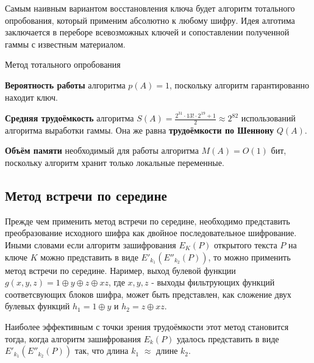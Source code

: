 \documentclass[a4paper,12pt]{article}
\theoremstyle{definition}
\begin{document}
	Самым наивным вариантом восстановления ключа будет алгоритм тотального опробования, который применим абсолютно к любому шифру. Идея алготима заключается в переборе всевозможных ключей и сопоставлении полученной гаммы с известным материалом.

	\begin{algorithm}[H]
		
		\caption{Метод тотального опробования}
		\label{alg:Total}
		\SetAlgoNoEnd
		
		
	\end{algorithm}	
	
	
	\textbf{Вероятность работы} алгоритма $p(A)=1$, поскольку алгоритм гарантированно находит ключ. 
	
	\textbf{Средняя трудоёмкость} алгоритма $S(A)=\frac{2^{31} \cdot 13! \cdot 2^{19} + 1}{2} \approx 2^{82} $ использований алгоритма выработки гаммы. Она же равна \textbf{трудоёмкости по Шеннону} $Q(A)$.
	
	\textbf{Объём памяти} необходимый для работы алгоритма $M(A) = O(1)$ бит, поскольку алгоритм хранит только локальные переменные.
	
	\subsection{Метод встречи по середине}
	
	Прежде чем применить метод встречи по середине, необходимо представить преобразование исходного шифра как двойное последовательное шифрование. Иными словами если алгоритм зашифрования $E_K(P)$ открытого текста $P$ на ключе $K$ можно представить в виде $E'_{k_1}(E''_{k_2}(P))$, то можно применить метод встречи по середине. Наример, выход булевой функции $g(x,y,z) = 1 \oplus y \oplus z \oplus x z$, где $x, y, z$ - выходы фильтрующих функций соответсвующих блоков шифра, может быть представлен, как сложение двух булевых функций $ h_1=1 \oplus y $ и $ h_2=z \oplus x z $. 
	
	Наиболее эффективным с точки зрения трудоёмкости этот метод становится тогда, когда алгоритм зашифрования $E_k(P)$ удалось представить в виде $E'_{k_1}(E''_{k_2}(P))$ так, что длина $k_1$ $\approx$ длине $k_2$.
	
\end{document}
